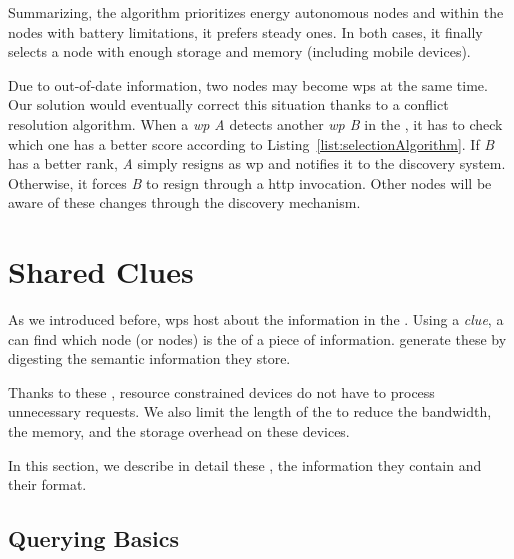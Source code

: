 Summarizing, the algorithm prioritizes energy autonomous nodes and within the nodes with battery limitations, it prefers steady ones.
In both cases, it finally selects a node with enough storage and memory (including mobile devices).


Due to out-of-date information, two nodes may become \acp{wp} at the same time.
Our solution would eventually correct this situation thanks to a conflict resolution algorithm.
When a \emph{\acs{wp} A} detects another \emph{\acs{wp} B} in the \Space{}, it has to check which one has a better score according to Listing~\ref{list:selectionAlgorithm}.
If \emph{B} has a better rank, \emph{A} simply resigns as \ac{wp} and notifies it to the discovery system.
Otherwise, it forces \emph{B} to resign through a \acs{http} invocation.
Other nodes will be aware of these changes through the discovery mechanism.




\section{Shared Clues}
\label{sec:clues}
As we introduced before, \acp{wp} host \clues{} about the information in the \Space{}.
Using a \emph{clue}, a \consumer{} can find which node (or nodes) is the \provider{} of a piece of information.
\providers{} generate these \clues{} by digesting the semantic information they store.

Thanks to these \clues{}, resource constrained devices do not have to process unnecessary requests.
We also limit the length of the \clues{} to reduce the bandwidth, the memory, and the storage overhead on these devices.

In this section, we describe in detail these \clues{}, the information they contain and their format.


\subsection{Querying Basics} %


